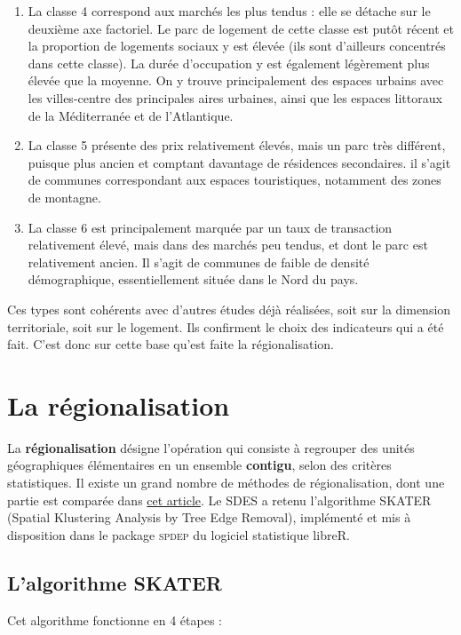 \documentclass[12pt, a4paper]{article}
\begin{document}
\begin{enumerate}
\item La classe 4 correspond aux marchés les plus tendus : elle se détache sur le deuxième axe factoriel. Le parc de logement de cette classe est putôt récent et la proportion de logements sociaux y est élevée (ils sont d'ailleurs concentrés dans cette classe). La durée d'occupation y est également légèrement plus élevée que la moyenne. On y trouve principalement des espaces urbains avec les villes-centre des principales aires urbaines, ainsi que les espaces littoraux de la Méditerranée et de l'Atlantique.
\item La classe 5 présente des prix relativement élevés, mais un parc très différent, puisque plus ancien et comptant davantage de résidences secondaires. il s'agit de communes correspondant aux espaces touristiques, notamment des zones de montagne.
\item La classe 6 est principalement marquée par un taux de transaction relativement élevé, mais dans des marchés peu tendus, et dont le parc est relativement ancien. Il s'agit de communes de faible de densité démographique, essentiellement située dans le Nord du pays.
\end{enumerate}


Ces types sont cohérents avec d'autres études déjà réalisées, soit sur la dimension territoriale, soit sur  le logement. Ils confirment le choix des indicateurs qui a été fait. C'est donc sur cette base qu'est faite la régionalisation.


\section{La régionalisation}

La \textbf{régionalisation} désigne l'opération qui consiste à regrouper des unités géographiques élémentaires en un ensemble \textbf{contigu}, selon des critères statistiques. Il existe un grand nombre de méthodes de régionalisation, dont une partie est comparée dans \href{http://journals.sagepub.com/doi/pdf/10.1177/0160017607301605}{cet article}. Le SDES a retenu l'algorithme SKATER (Spatial Klustering Analysis by Tree Edge Removal), implémenté et mis à disposition dans le package \textsc{spdep} du logiciel statistique libre\textsc{R}.

\subsection{L'algorithme SKATER}

Cet algorithme fonctionne en 4 étapes :
\end{document}
